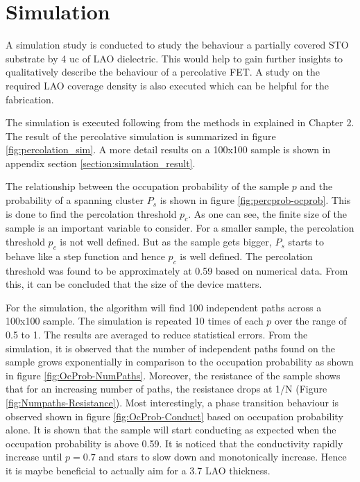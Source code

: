 \documentclass[11pt,a4paper]{report}
\begin{document}
\newpage

\section{Simulation}
A simulation study is conducted to study the behaviour a partially covered STO substrate by 4 uc of LAO dielectric. This would help to gain further insights to qualitatively describe the behaviour of a percolative FET. A study on the required LAO coverage density is also executed which can be helpful for the fabrication. 

The simulation is executed following from the methods in explained in Chapter 2. The result of the percolative simulation is summarized in figure \ref{fig:percolation_sim}. A more detail results on a 100x100 sample is shown in appendix section \ref{section:simulation_result}.

The relationship between the occupation probability of the sample $p$ and the probability of a spanning cluster $P_s$ is shown in figure \ref{fig:percprob-ocprob}. This is done to find the percolation threshold $p_c$. As one can see, the finite size of the sample is an important variable to consider. For a smaller sample, the percolation threshold $p_c$ is not well defined. But as the sample gets bigger, $P_s$ starts to behave like a step function and hence $p_c$ is well defined. The percolation threshold was found to be approximately at 0.59 based on numerical data. From this, it can be concluded that the size of the device matters. 

For the simulation, the algorithm will find 100 independent paths across a 100x100 sample. The simulation is repeated 10 times of each $p$ over the range of 0.5 to 1. The results are averaged to reduce statistical errors. From the simulation, it is observed that the number of independent paths found on the sample grows exponentially in comparison to the occupation probability as shown in figure \ref{fig:OcProb-NumPaths}. Moreover, the resistance of the sample shows that for an increasing number of paths, the resistance drops at 1/N (Figure \ref{fig:Numpaths-Resistance}). Most interestingly, a phase transition behaviour is observed shown in figure \ref{fig:OcProb-Conduct} based on occupation probability alone. It is shown that the sample will start conducting as expected when the occupation probability is above 0.59. It is noticed that the conductivity rapidly increase until $p=0.7$ and stars to slow down and monotonically increase. Hence it is maybe beneficial to actually aim for a 3.7 LAO thickness. 
\end{document}
